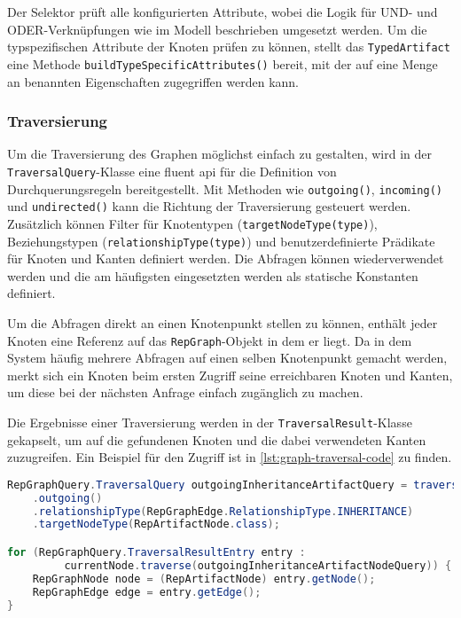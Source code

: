 Der Selektor prüft alle konfigurierten Attribute, wobei die Logik für UND- und ODER-Verknüpfungen wie im Modell beschrieben umgesetzt werden.
Um die typspezifischen Attribute der Knoten prüfen zu können, stellt das \texttt{TypedArtifact} eine Methode \texttt{buildTypeSpecificAttributes()} bereit, mit der auf eine Menge an benannten Eigenschaften zugegriffen werden kann.

\subsubsection{Traversierung}

Um die Traversierung des Graphen möglichst einfach zu gestalten, wird in der \texttt{TraversalQuery}-Klasse eine fluent \acrshort{api} für die Definition von Durchquerungsregeln bereitgestellt.
Mit Methoden wie \texttt{outgoing()}, \texttt{incoming()} und \texttt{undirected()} kann die Richtung der Traversierung gesteuert werden.
Zusätzlich können Filter für Knotentypen (\texttt{targetNodeType(type)}), Beziehungstypen (\texttt{relationshipType(type)}) und benutzerdefinierte Prädikate für Knoten und Kanten definiert werden.
Die Abfragen können wiederverwendet werden und die am häufigsten eingesetzten werden als statische Konstanten definiert.

Um die Abfragen direkt an einen Knotenpunkt stellen zu können, enthält jeder Knoten eine Referenz auf das \texttt{RepGraph}-Objekt in dem er liegt.
Da in dem System häufig mehrere Abfragen auf einen selben Knotenpunkt gemacht werden, merkt sich ein Knoten beim ersten Zugriff seine erreichbaren Knoten und Kanten, um diese bei der nächsten Anfrage einfach zugänglich zu machen.

Die Ergebnisse einer Traversierung werden in der \texttt{TraversalResult}-Klasse gekapselt, um auf die gefundenen Knoten und die dabei verwendeten Kanten zuzugreifen.
Ein Beispiel für den Zugriff ist in \autoref{lst:graph-traversal-code} zu finden.

\begin{lstlisting}[language=Java,caption={Durchquerungsabfragen in Java},label=lst:graph-traversal-code,basicstyle=\ttfamily\scriptsize]
RepGraphQuery.TraversalQuery outgoingInheritanceArtifactQuery = traversalQuery()
    .outgoing()
    .relationshipType(RepGraphEdge.RelationshipType.INHERITANCE)
    .targetNodeType(RepArtifactNode.class);

for (RepGraphQuery.TraversalResultEntry entry :
         currentNode.traverse(outgoingInheritanceArtifactNodeQuery)) {
    RepGraphNode node = (RepArtifactNode) entry.getNode();
    RepGraphEdge edge = entry.getEdge();
}
\end{lstlisting}

